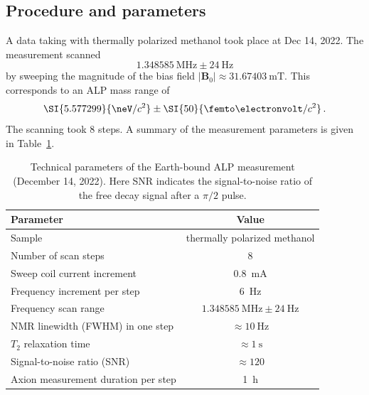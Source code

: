 \subsection{Procedure and parameters}

A data taking with thermally polarized methanol took place at Dec 14, 2022. 
The measurement scanned 
\begin{equation}
    \SI{1.348585}{\MHz} \pm \SI{24}{\Hz} \nonumber
\end{equation}
by sweeping the magnitude of the bias field $|\mathbf{B}_0| \approx \SI{31.67403}{\milli\tesla}$.
This corresponds to an ALP mass range of 
\begin{equation}
    \SI{5.577299}{\neV/c^2} \pm \SI{50}{\femto\electronvolt/c^2}\,. \nonumber
\end{equation}
The scanning took 8 steps. 
A summary of the measurement parameters is given in Table~\ref{tab:earthmeas_params}. 

\begin{table}[htb]
    \centering
    \caption{Technical parameters of the Earth-bound ALP measurement (December 14, 2022). Here SNR indicates the signal-to-noise ratio of the free decay signal after a $\pi/2$ pulse.}
    \label{tab:earthmeas_params}
    \begin{tabular}{lc}
        \toprule
        Parameter & Value \\
        \hline
        Sample & thermally polarized methanol \\
        Number of scan steps & 8 \\
        Sweep coil current increment & \SI{0.8}{\mA} \\
        Frequency increment per step & \SI{6}{\Hz} \\
        Frequency scan range & $\SI{1.348585}{\MHz} \pm \SI{24}{\Hz}$ \\
        NMR linewidth (FWHM) in one step & $\approx\SI{10}{\Hz}$ \\
        $T_2$ relaxation time & $\approx\SI{1}{\s}$ \\
        Signal-to-noise ratio (SNR) & $\approx 120$ \\
        Axion measurement duration per step & \SI{1}{\hour} \\
        \bottomrule
    \end{tabular}
\end{table}

